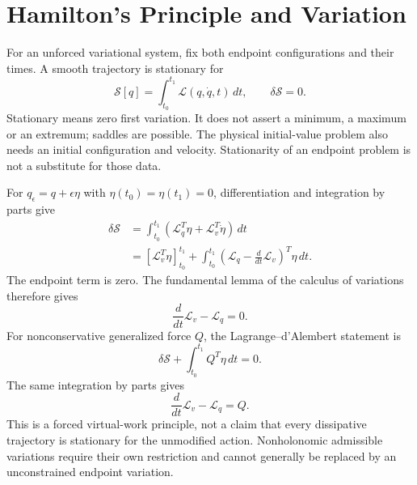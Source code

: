 \section{Hamilton's Principle and Variation}
\label{sec:lagrangian_action}

For an unforced variational system, fix both endpoint configurations and their times. A smooth trajectory is stationary for
\begin{equation}
\mathcal S[q]=\int_{t_0}^{t_1}\mathcal L(q,\dot q,t)\,dt,
\qquad \delta\mathcal S=0.
\label{eq:hamilton_principle}
\end{equation}
Stationary means zero first variation. It does not assert a minimum, a maximum or an extremum; saddles are possible. The physical initial-value problem also needs an initial configuration and velocity. Stationarity of an endpoint problem is not a substitute for those data.

For $q_\epsilon=q+\epsilon\eta$ with $\eta(t_0)=\eta(t_1)=0$, differentiation and integration by parts give
\begin{equation}
\begin{aligned}
\delta\mathcal S
&=\int_{t_0}^{t_1}(\mathcal L_q^T\eta+\mathcal L_v^T\dot\eta)\,dt\\
&=[\mathcal L_v^T\eta]_{t_0}^{t_1}
+\int_{t_0}^{t_1}\left(\mathcal L_q-
\frac{d}{dt}\mathcal L_v\right)^T\eta\,dt.
\end{aligned}
\label{eq:lagrangian_variation}
\end{equation}
The endpoint term is zero. The fundamental lemma of the calculus of variations therefore gives
\begin{equation}
\frac{d}{dt}\mathcal L_v-\mathcal L_q=0.
\label{eq:euler_lagrange}
\end{equation}
For nonconservative generalized force $Q$, the Lagrange--d'Alembert statement is
\begin{equation}
\delta\mathcal S+\int_{t_0}^{t_1}Q^T\eta\,dt=0.
\label{eq:lagrangian_forced_variation}
\end{equation}
The same integration by parts gives
\begin{equation}
\frac{d}{dt}\mathcal L_v-\mathcal L_q=Q.
\label{eq:el_with_torque}
\end{equation}
This is a forced virtual-work principle, not a claim that every dissipative trajectory is stationary for the unmodified action. Nonholonomic admissible variations require their own restriction and cannot generally be replaced by an unconstrained endpoint variation.

